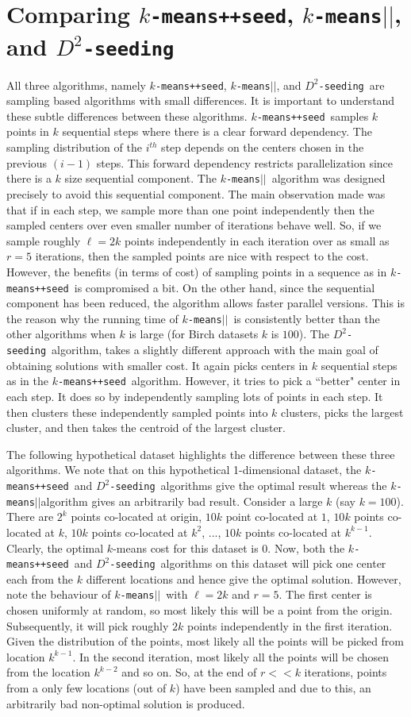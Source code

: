 \documentclass{article} %
\newcommand{\kmpp}{{\tt $k$-means++seed}}
\newcommand{\ds}{{\tt $D^2$-seeding}}
\newcommand{\kmpar}{{\tt $k$-means$||$}}
\begin{document}
\section{Comparing \kmpp, \kmpar,  and \ds}
All three algorithms, namely \kmpp, \kmpar, and \ds\ are sampling based algorithms with small differences.
It is important to understand these subtle differences between these algorithms.
\kmpp\ samples $k$ points in $k$ sequential steps where there is a clear forward dependency. 
The sampling distribution of the $i^{th}$ step depends on the centers chosen in the previous $(i-1)$ steps.
This forward dependency restricts parallelization since there is a $k$ size sequential component.
The \kmpar\ algorithm was designed precisely to avoid this sequential component. 
The main observation made was that if in each step, we sample more than one point independently then the sampled centers over even smaller number of iterations behave well.
So, if we sample roughly $\ell = 2k$ points independently in each iteration over as small as $r=5$ iterations, then the sampled points are nice with respect to the cost. 
However, the benefits (in terms of cost) of sampling points in a sequence as in \kmpp\ is compromised a bit.
On the other hand, since the sequential component has been reduced, the algorithm allows faster parallel versions.
This is the reason why the running time of \kmpar\ is consistently better than the other algorithms when $k$ is large (for Birch datasets $k$ is $100$).
The \ds\ algorithm, takes a slightly different approach with the main goal of obtaining solutions with smaller cost. 
It again picks centers in $k$ sequential steps as in the \kmpp\ algorithm.
However, it tries to pick a ``better" center in each step. 
It does so by independently sampling lots of points in each step. 
It then clusters these independently sampled points into $k$ clusters, picks the largest cluster, and then takes the centroid of the largest cluster.

The following hypothetical dataset highlights the difference between these three algorithms.
We note that on this hypothetical 1-dimensional dataset, the \kmpp\ and \ds\ algorithms give the optimal result whereas the \kmpar algorithm gives an arbitrarily bad result. 
Consider a large $k$ (say $k = 100$).
There are $2^{k}$ points co-located at origin, $10k$ point co-located at $1$, $10k$ points co-located at $k$, $10k$ points co-located at $k^2$, ..., $10k$ points co-located at $k^{k-1}$.
Clearly, the optimal $k$-means cost for this dataset is $0$.
Now, both the \kmpp\ and \ds\ algorithms on this dataset will pick one center each from the $k$ different locations and hence give the optimal solution. 
However, note the behaviour of \kmpar\ with $\ell = 2k$ and $r=5$. The first center is chosen uniformly at random, so most likely this will be a point from the origin. 
Subsequently, it will pick roughly $2k$ points independently in the first iteration. 
Given the distribution of the points, most likely all the points will be picked from location $k^{k-1}$.
In the second iteration, most likely all the points will be chosen from the location $k^{k-2}$ and so on. 
So, at the end of $r << k$ iterations, points from a only few locations (out of $k$) have been sampled and due to this, an arbitrarily bad non-optimal solution is produced.
\end{document}
